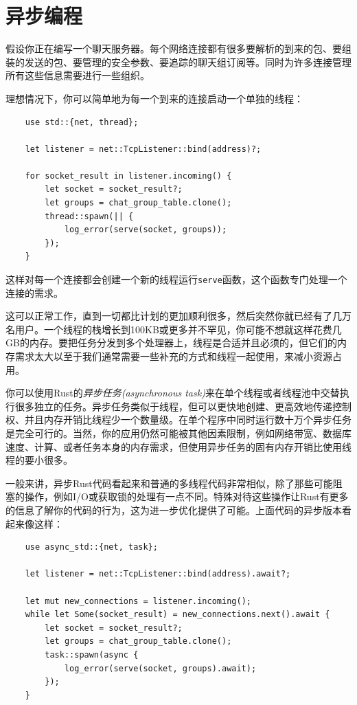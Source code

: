 \chapter{异步编程}\label{ch20}

假设你正在编写一个聊天服务器。每个网络连接都有很多要解析的到来的包、要组装的发送的包、要管理的安全参数、要追踪的聊天组订阅等。同时为许多连接管理所有这些信息需要进行一些组织。

理想情况下，你可以简单地为每一个到来的连接启动一个单独的线程：
\begin{verbatim}
    use std::{net, thread};

    let listener = net::TcpListener::bind(address)?;

    for socket_result in listener.incoming() {
        let socket = socket_result?;
        let groups = chat_group_table.clone();
        thread::spawn(|| {
            log_error(serve(socket, groups));
        });
    }
\end{verbatim}

这样对每一个连接都会创建一个新的线程运行\texttt{serve}函数，这个函数专门处理一个连接的需求。

这可以正常工作，直到一切都比计划的更加顺利很多，然后突然你就已经有了几万名用户。一个线程的栈增长到100KB或更多并不罕见，你可能不想就这样花费几GB的内存。要把任务分发到多个处理器上，线程是合适并且必须的，但它们的内存需求太大以至于我们通常需要一些补充的方式和线程一起使用，来减小资源占用。

你可以使用Rust的\emph{异步任务(asynchronous task)}来在单个线程或者线程池中交替执行很多独立的任务。异步任务类似于线程，但可以更快地创建、更高效地传递控制权、并且内存开销比线程少一个数量级。在单个程序中同时运行数十万个异步任务是完全可行的。当然，你的应用仍然可能被其他因素限制，例如网络带宽、数据库速度、计算、或者任务本身的内存需求，但使用异步任务的固有内存开销比使用线程的要小很多。

一般来讲，异步Rust代码看起来和普通的多线程代码非常相似，除了那些可能阻塞的操作，例如I/O或获取锁的处理有一点不同。特殊对待这些操作让Rust有更多的信息了解你的代码的行为，这为进一步优化提供了可能。上面代码的异步版本看起来像这样：
\begin{verbatim}
    use async_std::{net, task};

    let listener = net::TcpListener::bind(address).await?;

    let mut new_connections = listener.incoming();
    while let Some(socket_result) = new_connections.next().await {
        let socket = socket_result?;
        let groups = chat_group_table.clone();
        task::spawn(async {
            log_error(serve(socket, groups).await);
        });
    }
\end{verbatim}

